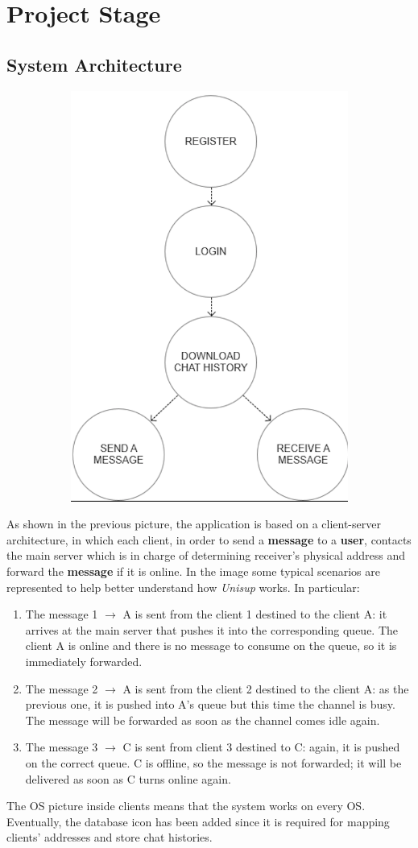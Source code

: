 \section{Project Stage}
\subsection{System Architecture}


\begin{figure}[H]
	\begin{subfigure}{\textwidth}
	\centering
		\includegraphics[width=0.3\linewidth]{img/dag.png} 
	\end{subfigure}
\end{figure}

As shown in the previous picture, the application is based on a client-server architecture, in which each client, in order to send a \textbf{message} to a \textbf{user}, contacts the main server which is in charge of determining receiver’s physical address and forward the \textbf{message} if it is online.
In the image some typical scenarios are represented to help better understand how \textit{Unisup} works. In particular:
\begin{enumerate}
	\item The message 1 $\xrightarrow{}$ A is sent from the client 1 destined to the client A:  it arrives at the main server that pushes it into the corresponding queue. The client A is online and there is no message to consume on the queue, so it is immediately forwarded.
	\item The message 2 $\xrightarrow{}$ A is sent from the client 2 destined to the client A:  as the previous one, it is pushed into A’s queue but this time the channel is busy. The message will be forwarded as soon as the channel comes idle again.
	\item The message 3 $\xrightarrow{}$ C is sent from client 3 destined to C: again, it is pushed on the correct queue. C is offline, so the message is not forwarded; it will be delivered as soon as C turns online again.
\end{enumerate}	
The OS picture inside clients means that the system works on every OS.
Eventually, the database icon has been added since it is required for mapping clients’ addresses and store chat histories. 



